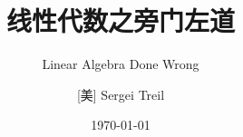 \documentclass[openany,twoside,zihao=-4]{zhbook}
\title{线性代数之旁门左道}  %
\subtitle{Linear Algebra Done Wrong}  %
\author{[美] Sergei Treil}  %
\date{\today}  %
\begin{document}
\maketitle

%



\frontmatter







\maketoc




% 



\mainmatter
























% 
\end{document}
